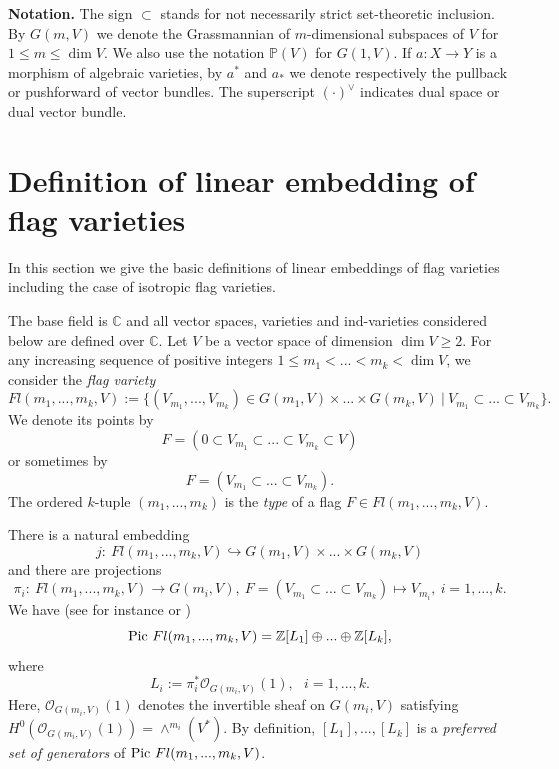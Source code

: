 \documentclass[12pt]{amsart}
\theoremstyle{definition}
\begin{document}
{\bf Notation.} The sign $\subset$ stands for not necessarily 
strict set-theoretic inclusion. By $G(m,V)$ we denote the 
Grassmannian of $m$-dimensional subspaces of $V$ for $1\le 
m\le\dim V$. We also use the notation $\mathbb{P}(V)$ for 
$G(1,V)$. If $a:X\to Y$ is a morphism of algebraic varieties,
by $a^*$ and $a_*$ we denote respectively the pullback or 
pushforward of vector bundles. The superscript $(\cdot)^{\vee}$
indicates dual space or dual vector bundle. 

\vspace{1cm}
\section{Definition of linear embedding of flag varieties} 
\label{preliminaries}
\vspace{5mm}

In this section we give the basic definitions of linear 
embeddings of flag varieties including the case of isotropic 
flag varieties.

The base field is $\mathbb{C}$ and all vector spaces, 
varieties and ind-varieties considered below are defined over
$\mathbb{C}$. Let $V$ be a vector space of dimension $\dim 
V\ge2$. For any increasing sequence of positive integers 
$1\le m_1<...< m_k<\dim V$, we consider the \textit{flag 
variety} 
$$
Fl(m_1,...,m_k,V):=\{(V_{m_1},...,V_{m_k})\in 
G(m_1,V)\times...\times G(m_k,V)\ |\ V_{m_1}\subset...\subset 
V_{m_k}\}.
$$ 
We denote its points by 
$$
F=(0\subset V_{m_1}\subset...\subset V_{m_k}\subset V)
$$ 
or sometimes by 
$$
F=(V_{m_1}\subset...\subset V_{m_k}).
$$ 
The ordered $k$-tuple
$(m_1,...,m_k)$ is the \textit{type} of a flag $F\in Fl(m_1,...,m_k,V)$.

There is a natural embedding 
$$
j:\ Fl(m_1,...,m_k,V)\hookrightarrow G(m_1,V)\times...\times 
G(m_k,V)
$$ 
and there are projections 
$$
\pi_i:\ Fl(m_1,...,m_k,V)\to G(m_i,V),\ F=(V_{m_1}\subset 
...\subset V_{m_k})\mapsto V_{m_i},\ i=1,...,k.
$$ 
We have  (see for instance \cite[Prop. 1.4.1]{B} or \cite[Ex. 14.7.16]{F})
$$
{\rm{Pic}}~Fl(m_1,...,m_k,V)=\mathbb{Z}[L_1]\oplus...\oplus
\mathbb{Z}[L_k],
$$
where
\begin{equation*}\label{generators}
L_i:=\pi_i^*\mathcal{O}_{G(m_i,V)}(1),\ \ \ i=1,...,k.
\end{equation*}
Here, $\mathcal{O}_{G(m_i,V)}(1)$ denotes the invertible sheaf 
on $G(m_i,V)$ satisfying $H^0(\mathcal{O}_{G(m_i,V)}(1))=
\wedge^{m_i}(V^*)$. By definition, $[L_1],...,[L_k]$ is a 
\textit{preferred set of generators} of ${\rm{Pic}}~Fl(m_1,...,
m_k,V)$.
\end{document}

